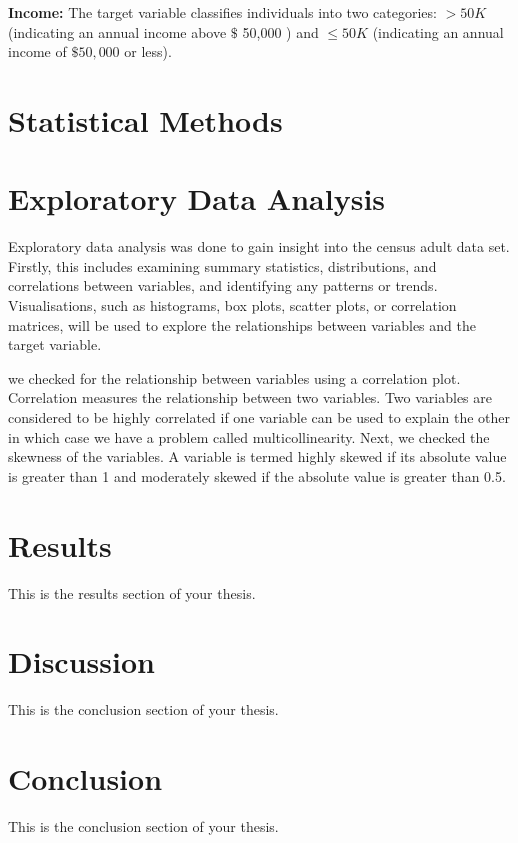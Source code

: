 \documentclass[12pt,a4paper,twoside,openright]{report}
\begin{document}
\textbf{Income:} The target variable classifies individuals into two categories: $ > 50K$ (indicating an annual income above $ \$ $ 50,000 ) and $\leq 50K$ (indicating an annual income of $ \$ 50,000$ or less).

\chapter{Statistical Methods}


\chapter{Exploratory Data Analysis}
Exploratory data analysis was done to gain insight into the census adult data set. Firstly, this includes examining summary statistics, distributions, and correlations between variables, and identifying any patterns or trends. Visualisations, such as histograms, box plots, scatter plots, or correlation matrices, will be used to explore the relationships between variables and the target variable.

we checked for the relationship between variables using a correlation plot. Correlation measures the relationship between two variables. Two variables are considered to be highly correlated if one variable can be used to explain the other in which case we have a problem called multicollinearity. Next, we checked the skewness of the variables. A variable is termed highly skewed if its absolute value is greater than 1 and moderately skewed if the absolute value is greater than 0.5.

\chapter{Results}
This is the results section of your thesis.

\chapter{Discussion}
This is the conclusion section of your thesis.

\chapter{Conclusion}
This is the conclusion section of your thesis.
\end{document}
